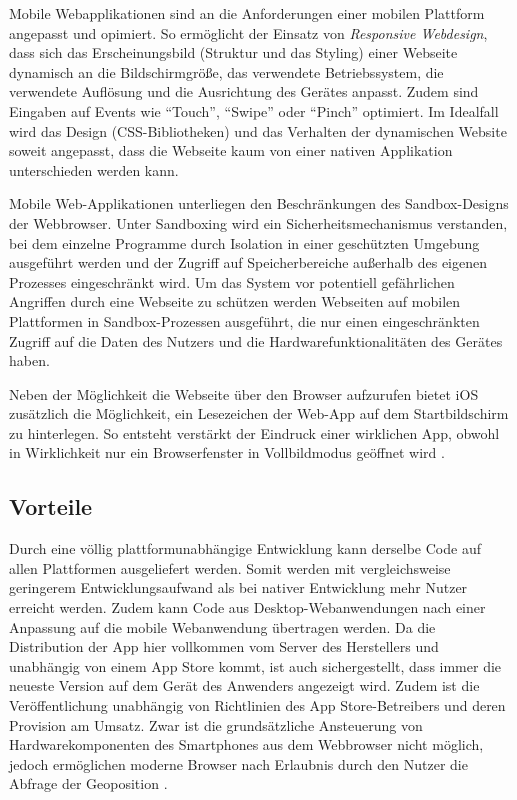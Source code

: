 Mobile Webapplikationen sind an die Anforderungen einer mobilen Plattform angepasst und opimiert. So ermöglicht der Einsatz von \emph{Responsive Webdesign}, dass sich das Erscheinungsbild (Struktur und das Styling) einer Webseite dynamisch an die Bildschirmgröße, das verwendete Betriebssystem, die verwendete Auflösung und die Ausrichtung des Gerätes anpasst. Zudem sind Eingaben auf Events wie \enquote{Touch}, \enquote{Swipe} oder \enquote{Pinch} optimiert. Im Idealfall wird das Design (CSS-Bibliotheken) und das Verhalten der dynamischen Website soweit angepasst, dass die Webseite kaum von einer nativen Applikation unterschieden werden kann. 

Mobile Web-Applikationen unterliegen den Beschränkungen des Sandbox-Designs der Webbrowser. Unter Sandboxing wird ein Sicherheitsmechanismus verstanden, bei dem einzelne Programme durch Isolation in einer geschützten Umgebung ausgeführt werden und der Zugriff auf Speicherbereiche außerhalb des eigenen Prozesses eingeschränkt wird. Um das System vor potentiell gefährlichen Angriffen durch eine Webseite zu schützen werden Webseiten auf mobilen Plattformen in Sandbox-Prozessen ausgeführt, die nur einen eingeschränkten Zugriff auf die Daten des Nutzers und die Hardwarefunktionalitäten des Gerätes haben. 

Neben der Möglichkeit die Webseite über den Browser aufzurufen bietet iOS zusätzlich die Möglichkeit, ein Lesezeichen der Web-App auf dem Startbildschirm zu hinterlegen. So entsteht verstärkt der Eindruck einer wirklichen App, obwohl in Wirklichkeit nur ein Browserfenster in Vollbildmodus geöffnet wird \cite{safariRef}.
%
\subsection{Vorteile}
%
Durch eine völlig plattformunabhängige Entwicklung kann derselbe Code auf allen Plattformen ausgeliefert werden. Somit werden mit vergleichsweise geringerem Entwicklungsaufwand als bei nativer Entwicklung mehr Nutzer erreicht werden. Zudem kann Code aus Desktop-Webanwendungen nach einer Anpassung auf die mobile Webanwendung übertragen werden. Da die Distribution der App hier vollkommen vom Server des Herstellers und unabhängig von einem App Store kommt, ist auch sichergestellt, dass immer die neueste Version auf dem Gerät des Anwenders angezeigt wird. Zudem ist die Veröffentlichung unabhängig von Richtlinien des App Store-Betreibers und deren Provision am Umsatz. Zwar ist die grundsätzliche Ansteuerung von Hardwarekomponenten des Smartphones aus dem Webbrowser nicht möglich, jedoch ermöglichen moderne Browser nach Erlaubnis durch den Nutzer die Abfrage der Geoposition \cite{browserGPS}.
%
